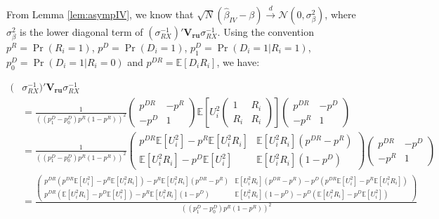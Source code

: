 \documentclass[
]{book}
\newcommand{\esp}[1]{\mathbb{E}[ #1 ]}
\theoremstyle{definition}
\theoremstyle{definition}
\theoremstyle{definition}
\theoremstyle{definition}
\theoremstyle{remark}
\begin{document}
From Lemma \ref{lem:asympIV}, we know that \(\sqrt{N}(\hat{\beta}_{IV}-\beta)\stackrel{d}{\rightarrow}\mathcal{N}(0,\sigma^2_{\beta})\), where \(\sigma^2_{\beta}\) is the lower diagonal term of \((\sigma_{RX}^{-1})'\mathbf{V_{ru}}\sigma_{RX}^{-1}\).
Using the convention \(p^R=\Pr(R_i=1)\), \(p^D=\Pr(D_i=1)\), \(p^D_1=\Pr(D_i=1|R_i=1)\), \(p^D_0=\Pr(D_i=1|R_i=0)\) and \(p^{DR}=\esp{D_iR_i}\), we have:

\begin{align*}
(&\sigma_{RX}^{-1})'\mathbf{V_{ru}}\sigma_{RX}^{-1} \\
                   & = \frac{1}{((p^D_1-p^D_0)p^R(1-p^R))^2}
                  \left(\begin{array}{cc}
                         p^{DR}  & -p^R\\
                        -p^D & 1
                          \end{array}\right)
                          \esp{U_i^2\left(\begin{array}{cc}  1 & R_i\\  R_i & R_i\end{array}\right)}
                        \left(\begin{array}{cc}
                                         p^{DR}  & -p^D\\
                                          -p^R & 1
                          \end{array}\right)\\
                    & = \frac{1}{((p^D_1-p^D_0)p^R(1-p^R))^2}
                         \left(\begin{array}{cc}
                         p^{DR}\esp{U_i^2}-p^R\esp{U_i^2R_i} & \esp{U_i^2R_i}(p^{DR}-p^R)\\
                        \esp{U_i^2R_i}-p^D\esp{U_i^2} & \esp{U_i^2R_i}(1-p^D)
                          \end{array}\right)
                          \left(\begin{array}{cc}
                                         p^{DR}  & -p^D\\
                                          -p^R & 1
                          \end{array}\right)\\
                    & = \frac{\left(\begin{array}{cc}
                          p^{DR}(p^{DR}\esp{U_i^2}-p^R\esp{U_i^2R_i})- p^R\esp{U_i^2R_i}(p^{DR}-p^R)
                            & \esp{U_i^2R_i}(p^{DR}-p^R)-p^{D}(p^{DR}\esp{U_i^2}-p^R\esp{U_i^2R_i})\\
                          p^{DR}(\esp{U_i^2R_i}-p^D\esp{U_i^2})-p^R\esp{U_i^2R_i}(1-p^D)
                            & \esp{U_i^2R_i}(1-p^D) - p^{D}(\esp{U_i^2R_i}-p^D\esp{U_i^2})
                          \end{array}\right)}{((p^D_1-p^D_0)p^R(1-p^R))^2}
 \end{align*}
\end{document}
